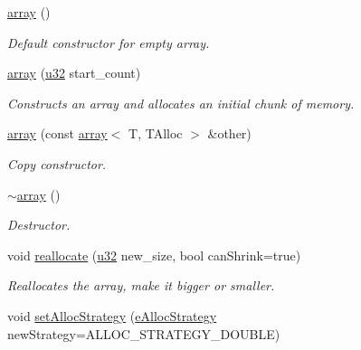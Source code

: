 \begin{DoxyCompactItemize}
\item 
\mbox{\label{classirr_1_1core_1_1array_a5e0dd817352068af92448a08716f1252}} 
\hyperlink{classirr_1_1core_1_1array_a5e0dd817352068af92448a08716f1252}{array} ()
\begin{DoxyCompactList}\small\item\em Default constructor for empty array. \end{DoxyCompactList}\item 
\hyperlink{classirr_1_1core_1_1array_ab58c4b2c09693190b43ee16e99722b43}{array} (\hyperlink{namespaceirr_a0416a53257075833e7002efd0a18e804}{u32} start\+\_\+count)
\begin{DoxyCompactList}\small\item\em Constructs an array and allocates an initial chunk of memory. \end{DoxyCompactList}\item 
\mbox{\label{classirr_1_1core_1_1array_a4e584fd375dd5f994b6bd7afd7f7a60c}} 
\hyperlink{classirr_1_1core_1_1array_a4e584fd375dd5f994b6bd7afd7f7a60c}{array} (const \hyperlink{classirr_1_1core_1_1array}{array}$<$ T, T\+Alloc $>$ \&other)
\begin{DoxyCompactList}\small\item\em Copy constructor. \end{DoxyCompactList}\item 
\hyperlink{classirr_1_1core_1_1array_aac1853f45d4c18feaacac9859efe9836}{$\sim$array} ()
\begin{DoxyCompactList}\small\item\em Destructor. \end{DoxyCompactList}\item 
void \hyperlink{classirr_1_1core_1_1array_ada5735f409eca82b9031d993ee8b31c3}{reallocate} (\hyperlink{namespaceirr_a0416a53257075833e7002efd0a18e804}{u32} new\+\_\+size, bool can\+Shrink=true)
\begin{DoxyCompactList}\small\item\em Reallocates the array, make it bigger or smaller. \end{DoxyCompactList}\item 
void \hyperlink{classirr_1_1core_1_1array_a7aef3e5dbf91f8d1e8f365039e2497ae}{set\+Alloc\+Strategy} (\hyperlink{namespaceirr_1_1core_aa2e91971d5e6e84de235bfabe3c7adba}{e\+Alloc\+Strategy} new\+Strategy=A\+L\+L\+O\+C\+\_\+\+S\+T\+R\+A\+T\+E\+G\+Y\+\_\+\+D\+O\+U\+B\+LE)

\end{DoxyCompactItemize}
